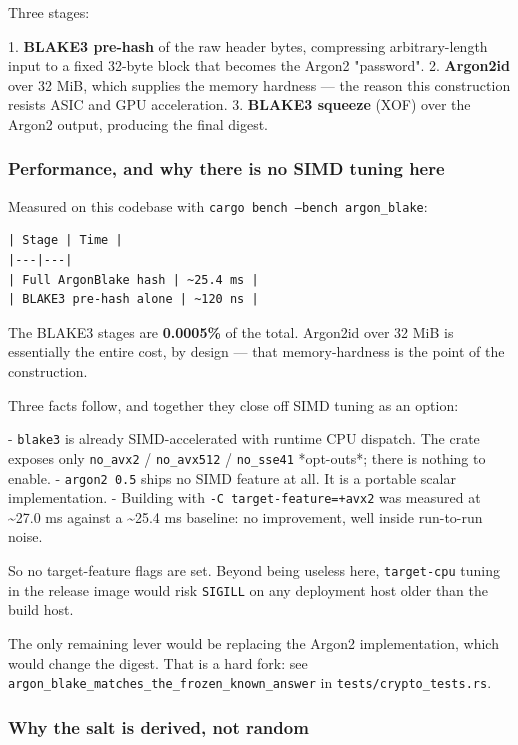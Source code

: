 \documentclass[11pt,a4paper]{article}
\begin{document}
Three stages:

1. \textbf{BLAKE3 pre-hash} of the raw header bytes, compressing arbitrary-length
   input to a fixed 32-byte block that becomes the Argon2 "password".
2. \textbf{Argon2id} over 32 MiB, which supplies the memory hardness — the reason
   this construction resists ASIC and GPU acceleration.
3. \textbf{BLAKE3 squeeze} (XOF) over the Argon2 output, producing the final
   digest.

\subsubsection{Performance, and why there is no SIMD tuning here}

Measured on this codebase with \texttt{cargo bench --bench argon\_blake}:

\begin{verbatim}
| Stage | Time |
|---|---|
| Full ArgonBlake hash | ~25.4 ms |
| BLAKE3 pre-hash alone | ~120 ns |
\end{verbatim}

The BLAKE3 stages are \textbf{0.0005\%} of the total. Argon2id over 32 MiB is
essentially the entire cost, by design — that memory-hardness is the point
of the construction.

Three facts follow, and together they close off SIMD tuning as an option:

- \texttt{blake3} is already SIMD-accelerated with runtime CPU dispatch. The crate
  exposes only \texttt{no\_avx2} / \texttt{no\_avx512} / \texttt{no\_sse41} *opt-outs*; there is
  nothing to enable.
- \texttt{argon2 0.5} ships no SIMD feature at all. It is a portable scalar
  implementation.
- Building with \texttt{-C target-feature=+avx2} was measured at \textasciitilde{}27.0 ms against a
  \textasciitilde{}25.4 ms baseline: no improvement, well inside run-to-run noise.

So no target-feature flags are set. Beyond being useless here, \texttt{target-cpu}
tuning in the release image would risk \texttt{SIGILL} on any deployment host older
than the build host.

The only remaining lever would be replacing the Argon2 implementation, which
would change the digest. That is a hard fork: see
\texttt{argon\_blake\_matches\_the\_frozen\_known\_answer} in \texttt{tests/crypto\_tests.rs}.

\subsubsection{Why the salt is derived, not random}
\end{document}
